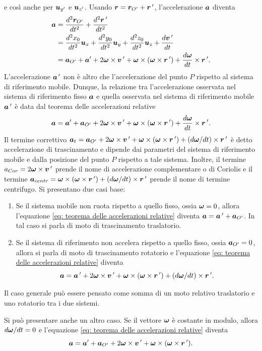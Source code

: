 e così anche per $\bm{u}_{y'}$ e $\bm{u}_{z'}$. Usando $\bm{r}=\bm{r}_{O'}+\bm{r}\,'$, l'accelerazione $\bm{a}$ diventa
\begin{equation}
    \begin{split}
        \bm{a}&=\frac{d^2\bm{r}_{O'}}{dt^2}+\frac{d^2\bm{r}\,'}{dt^2} \\
        &=\frac{d^2x_0}{dt^2}\bm{u}_x+\frac{d^2y_0}{dt^2}\bm{u}_y+\frac{d^2z_0}{dt^2}\bm{u}_z+\frac{d\bm{v}\,'}{dt} \\
        &=\bm{a}_{O'}+\bm{a}'+2\bm{\omega}\times\bm{v}\,'+\bm{\omega}\times(\bm{\omega}\times\bm{r}\,')+\frac{d\bm{\omega}}{dt}\times\bm{r}\,'.
    \end{split}
\end{equation}
L'accelerazione $\bm{a}\,'$ non è altro che l'accelerazione del punto $P$ rispetto al sistema di riferimento mobile. Dunque, la relazione tra l'accelerazione osservata nel sistema di riferimento fisso $\bm{a}$ e quella osservata nel sistema di riferimento mobile $\bm{a}\,'$ è data dal teorema delle accelerazioni relative
\begin{equation}
\label{eq: teorema delle accelerazioni relative}
    \bm{a}=\bm{a}'+\bm{a}_{O'}+2\bm{\omega}\times\bm{v}\,'+\bm{\omega}\times(\bm{\omega}\times\bm{r}\,')+\frac{d\bm{\omega}}{dt}\times\bm{r}\,'.
\end{equation}
Il termine correttivo $\bm{a}_t=\bm{a}_{O'}+2\bm{\omega}\times\bm{v}\,'+\bm{\omega}\times(\bm{\omega}\times\bm{r}\,')+(d\bm{\omega}/dt)\times\bm{r}\,'$ è detto accelerazione di trascinamento e dipende dai parametri del sistema di riferimento mobile e dalla posizione del punto $P$ rispetto a tale sistema. Inoltre, il termine $a_{Cor}=2\bm{\omega}\times\bm{v}\,'$ prende il nome di accelerazione complementare o di Coriolis e il termine $\bm{a}_{centr}=\bm{\omega}\times(\bm{\omega}\times\bm{r}\,')+(d\bm{\omega}/dt)\times\bm{r}\,'$ prende il nome di termine centrifugo. Si presentano due casi base:
\begin{enumerate}
    \item Se il sistema mobile non ruota rispetto a quello fisso, ossia $\bm{\omega}=0$, allora l'equazione \eqref{eq: teorema delle accelerazioni relative} diventa $\bm{a}=\bm{a}\,'+\bm{a}_{O'}$. In tal caso si parla di moto di trascinamento traslatorio.
    \item Se il sistema di riferimento non accelera rispetto a quello fisso, ossia $\bm{a}_{O'}=0$, allora si parla di moto di trascinamento rotatorio e l'equazione \eqref{eq: teorema delle accelerazioni relative} diventa 
    \begin{equation}
        \bm{a}=\bm{a}\,'+2\bm{\omega}\times\bm{v}\,'+\bm{\omega}\times(\bm{\omega}\times\bm{r}\,')+(d\bm{\omega}/dt)\times\bm{r}\,'.
    \end{equation}
\end{enumerate}
Il caso generale può essere pensato come somma di un moto relativo traslatorio e uno rotatorio tra i due sistemi. 
\begin{obs}
    Si può presentare anche un altro caso. Se il vettore $\bm{\omega}$ è costante in modulo, allora $d\bm{\omega}/dt=0$ e l'equazione \eqref{eq: teorema delle accelerazioni relative} diventa 
    \begin{equation}
        \bm{a}=\bm{a}'+\bm{a}_{O'}+2\bm{\omega}\times\bm{v}\,'+\bm{\omega}\times(\bm{\omega}\times\bm{r}\,').
    \end{equation}
\end{obs}

